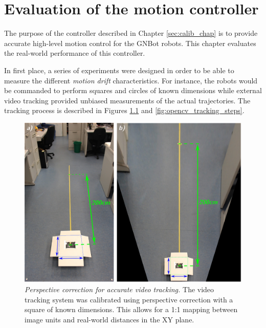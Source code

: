\documentclass[12pt,twoside]{report}
\begin{document}
\chapter{Evaluation of the motion controller} \label{sec:eval_chap}

The purpose of the controller described in Chapter \ref{sec:calib_chap} is to provide accurate high-level motion control for the GNBot robots.
This chapter evaluates the real-world performance of this controller.

In first place, a series of experiments were designed in order to be able to measure the different \emph{motion drift} characteristics. For instance, the robots would be commanded to perform squares and circles of known dimensions while external video tracking provided unbiased measurements of the actual trajectories. 
The tracking process is described in Figures \ref{fig:perspective_correction} and \ref{fig:opencv_tracking_steps}.



\begin{figure}[hbtp]
\centerline{\includegraphics[width=0.7\linewidth]{perspective_correction}}
\caption[Perspective correction for accurate video tracking]{\emph{Perspective correction for accurate video tracking.}
The video tracking system was calibrated using perspective correction with a square of known dimensions. This allows for a 1:1 mapping between image units and real-world distances in the XY plane. 
}
\label{fig:perspective_correction}
\end{figure}
\end{document}
